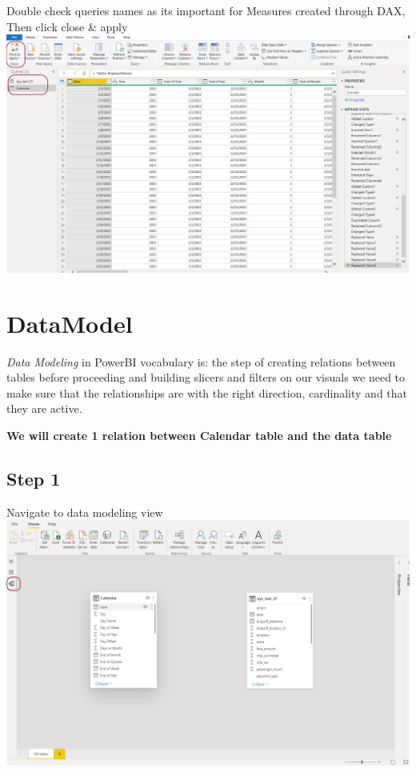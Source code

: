 \documentclass[
]{book}
\begin{document}
Double check queries names as its important for Measures created through DAX,
Then click close \& apply
\includegraphics{assets/get_data3.png}

\hypertarget{datamodel}{%
\chapter{DataModel}\label{datamodel}}

\emph{Data Modeling} in PowerBI vocabulary is: the step of creating relations between tables before proceeding and building slicers and filters on our visuals we need to make sure that the relationships are with the right direction, cardinality and that they are active.

\textbf{We will create 1 relation between Calendar table and the data table}

\hypertarget{step-1-1}{%
\section{Step 1}\label{step-1-1}}

Navigate to data modeling view
\includegraphics{assets/datamodel1.png}
\end{document}
